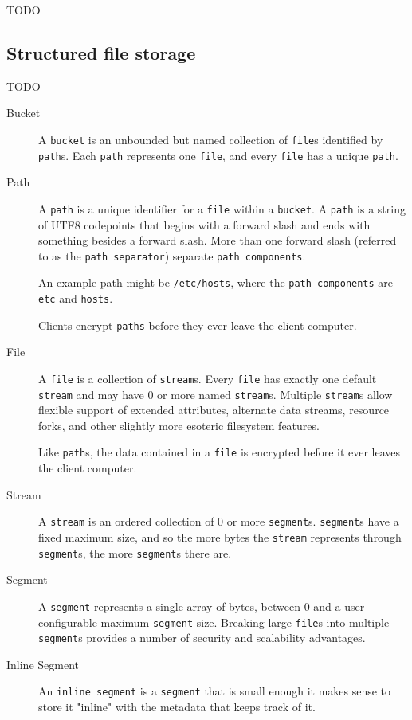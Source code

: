 \documentclass[a4paper,10pt]{article}
\newcommand{\x}[1]{{\tt #1}}
\newcommand{\code}[1]{{\tt #1}}
\newcommand{\todo}[1]{{\color{red} TODO #1}}
\begin{document}
\todo{}

\subsection{Structured file storage}

\todo{}

\begin{description}
\item[Bucket] A \x{bucket} is an unbounded but named collection of
\x{file}s identified by \x{path}s. Each \x{path} represents one
\x{file}, and every \x{file} has a unique \x{path}.

\item[Path] A \x{path} is a unique identifier for a \x{file} within a
\x{bucket}. A \x{path} is a string of UTF8 codepoints that begins with a forward
slash and ends with something besides a forward slash. More than one forward
slash (referred to as the \x{path separator}) separate \x{path components}.

An example path might be \code{/etc/hosts}, where the \x{path components} are
\code{etc} and \code{hosts}.

Clients encrypt \x{paths} before they ever leave the client computer.

\item[File] A \x{file} is a collection of \x{stream}s. Every \x{file} has
exactly one default \x{stream} and may have 0 or more named \x{stream}s.
Multiple \x{stream}s allow flexible support of extended attributes, alternate
data streams, resource forks, and other slightly more esoteric filesystem
features.

Like \x{path}s, the data contained in a \x{file} is encrypted before it ever
leaves the client computer.

\item[Stream] A \x{stream} is an ordered collection of 0 or more \x{segment}s.
\x{segment}s have a fixed maximum size, and so the more bytes the \x{stream}
represents through \x{segment}s, the more \x{segment}s there are.

\item[Segment] A \x{segment} represents a single array of bytes, between 0 and a
user-configurable maximum \x{segment} size. Breaking large \x{file}s into
multiple \x{segment}s provides a number of security and scalability advantages.

\item[Inline Segment] An \x{inline segment} is a \x{segment} that is small
enough it makes sense to store it "inline" with the metadata that keeps track of
it.


\end{description}
\end{document}

